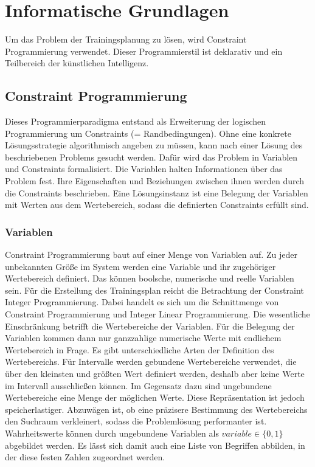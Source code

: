 \chapter{Informatische Grundlagen}
\label{sec:grundlagen:info}
Um das Problem der Trainingsplanung zu lösen, wird Constraint Programmierung verwendet. Dieser Programmierstil ist deklarativ und ein Teilbereich der künstlichen Intelligenz.

\section{Constraint Programmierung}
Dieses Programmierparadigma entstand als Erweiterung der logischen Programmierung um Constraints (= Randbedingungen). Ohne eine konkrete Lösungsstrategie algorithmisch angeben zu müssen, kann nach einer Lösung des beschriebenen Problems gesucht werden. Dafür wird das Problem in Variablen und Constraints formalisiert. Die Variablen halten Informationen über das Problem fest. Ihre Eigenschaften und Beziehungen zwischen ihnen werden durch die Constraints beschrieben. Eine Lösungsinstanz ist eine Belegung der Variablen mit Werten aus dem Wertebereich, sodass die definierten Constraints erfüllt sind. \cite{EssentialsConstraintProgrammierung, HandbookConstraintProgramming}

\subsection{Variablen}
Constraint Programmierung baut auf einer Menge von Variablen auf. Zu jeder unbekannten Größe im System werden eine Variable und ihr zugehöriger Wertebereich definiert. Das können boolsche, numerische und reelle Variablen sein.
Für die Erstellung des Trainingsplan reicht die Betrachtung der Constraint Integer Programmierung. Dabei handelt es sich um die Schnittmenge von Constraint Programmierung und Integer Linear Programmierung. Die wesentliche Einschränkung betrifft die Wertebereiche der Variablen. Für die Belegung der Variablen kommen dann nur ganzzahlige numerische Werte mit endlichem Wertebereich in Frage. %
Es gibt unterschiedliche Arten der Definition des Wertebereichs. Für Intervalle werden gebundene Wertebereiche verwendet, die über den kleinsten und größten Wert definiert werden, deshalb aber keine Werte im Intervall ausschließen können. Im Gegensatz dazu sind ungebundene Wertebereiche eine Menge der möglichen Werte. Diese Repräsentation ist jedoch speicherlastiger. Abzuwägen ist, ob eine präzisere Bestimmung des Wertebereichs den Suchraum verkleinert, sodass die Problemlösung performanter ist.
Wahrheitswerte können durch ungebundene Variablen als $variable \in \{0, 1\}$ abgebildet werden. Es lässt sich damit auch eine Liste von Begriffen abbilden, in der diese festen Zahlen zugeordnet werden. \cite{HandbookKnowledgeRepresentation}

